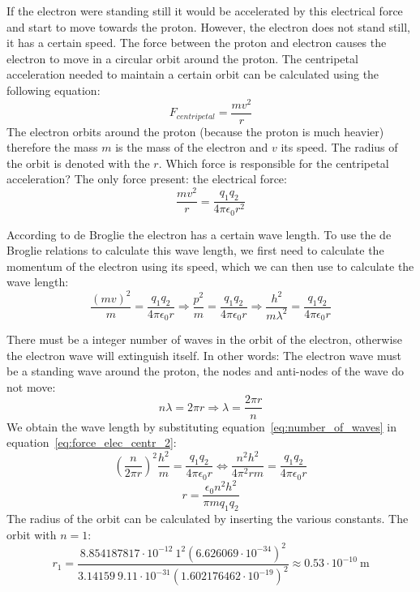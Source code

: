 If the electron were standing still it would be accelerated by this electrical force and start to move towards the proton. However, the electron does not stand still, it has a certain speed. The force between the proton and electron causes the electron to move in a circular orbit around the proton. The centripetal acceleration needed to maintain a certain orbit can be calculated using the following equation:
\begin{equation}
F_{centripetal} = \frac{m v^2}{r} \label{eq:force_cent} 
\end{equation}
The electron orbits around the proton (because the proton is much heavier) therefore the mass $m$ is the mass of the electron and $v$ its speed. The radius of the orbit is denoted with the $r$. Which force is responsible for the centripetal acceleration? The only force present: the electrical force:
\begin{equation}
\frac{m v^2}{r} = \frac{q_1 q_2}{4 \pi \epsilon_0 r^2} \label{eq:force_elec_centr} 
\end{equation}

According to de Broglie the electron has a certain wave length. To use the de Broglie relations to calculate this wave length, we first need to calculate the momentum of the electron using its speed, which we can then use to calculate the wave length:
\begin{equation}
\frac{\left( {m v}\right) ^2}{m} = \frac{q_1 q_2}{4 \pi \epsilon_0 r} \Rightarrow \frac{p^2}{m}=\frac{q_1 q_2}{4 \pi \epsilon_0 r} \Rightarrow \frac{h^2}{m \lambda^2} = \frac{q_1 q_2}{4 \pi \epsilon_0 r} \label{eq:force_elec_centr_2} 
\end{equation}

There must be a integer number of waves in the orbit of the electron, otherwise the electron wave will extinguish itself. In other words: The electron wave must be a standing wave around the proton, the nodes and anti-nodes of the wave do not move:
\begin{equation}
n \lambda = 2 \pi r \Rightarrow \lambda = \frac{2 \pi r}{n} \label{eq:number_of_waves} 
\end{equation}
We obtain the wave length by substituting equation~\ref{eq:number_of_waves} in equation~\ref{eq:force_elec_centr_2}:
\begin{equation}
\left( \frac{n}{2 \pi r}\right)^2 \frac{h^2}{m} = \frac{q_1 q_2}{4 \pi \epsilon_0 r} \Leftrightarrow \frac{n^2 h^2}{4 \pi^2 r m} = \frac{q_1 q_2}{4 \pi \epsilon_0 r} \label{eq:number_of_waves_centr2} 
\end{equation}
\begin{equation}
r=\frac{\epsilon_0 n^2 h^2}{\pi m q_1 q_2} \label{eq:result_r} 
\end{equation}
The radius of the orbit can be calculated by inserting the various constants. The orbit with $n=1$:
\begin{equation}
r_1=\frac{8.854187817 \cdot 10^{-12} ~ 1^2 \left( 6.626069 \cdot 10^{-34} \right)^2 }{3.14159 ~ 9.11 \cdot 10^{-31} \left( 1.602176462 \cdot 10^{-19} \right)^2 } \approx 0.53 \cdot 10^{-10}~\mbox{m} \label{eq:result_r_1} 
\end{equation}

